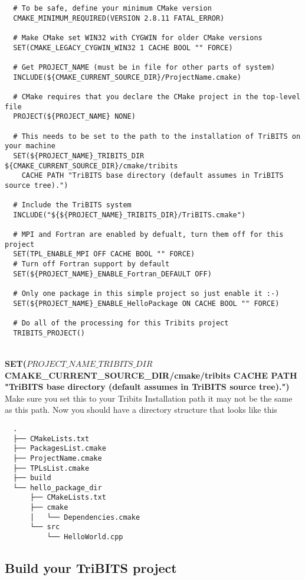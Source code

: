 \documentclass[12pt]{article}
\begin{document}
\begin{verbatim}
  # To be safe, define your minimum CMake version
  CMAKE_MINIMUM_REQUIRED(VERSION 2.8.11 FATAL_ERROR)
  
  # Make CMake set WIN32 with CYGWIN for older CMake versions
  SET(CMAKE_LEGACY_CYGWIN_WIN32 1 CACHE BOOL "" FORCE)
  
  # Get PROJECT_NAME (must be in file for other parts of system)
  INCLUDE(${CMAKE_CURRENT_SOURCE_DIR}/ProjectName.cmake)
  
  # CMake requires that you declare the CMake project in the top-level file
  PROJECT(${PROJECT_NAME} NONE)

  # This needs to be set to the path to the installation of TriBITS on your machine  
  SET(${PROJECT_NAME}_TRIBITS_DIR ${CMAKE_CURRENT_SOURCE_DIR}/cmake/tribits
    CACHE PATH "TriBITS base directory (default assumes in TriBITS source tree).")

  # Include the TriBITS system
  INCLUDE("${${PROJECT_NAME}_TRIBITS_DIR}/TriBITS.cmake")
  
  # MPI and Fortran are enabled by defualt, turn them off for this project
  SET(TPL_ENABLE_MPI OFF CACHE BOOL "" FORCE)
  # Turn off Fortran support by default
  SET(${PROJECT_NAME}_ENABLE_Fortran_DEFAULT OFF)
  
  # Only one package in this simple project so just enable it :-)
  SET(${PROJECT_NAME}_ENABLE_HelloPackage ON CACHE BOOL "" FORCE)
  
  # Do all of the processing for this Tribits project
  TRIBITS_PROJECT()
\end{verbatim}


\textbf{\\SET(${PROJECT\_NAME}\_TRIBITS\_DIR ${CMAKE\_CURRENT\_SOURCE\_DIR}/cmake/tribits 
    CACHE PATH "TriBITS base directory (default assumes in TriBITS source tree).")}
Make sure you set this to your Tribits Installation path it may not be the same as
this path.  Now you should have a directory structure that looks like this

\begin{verbatim}
  .
  ├── CMakeLists.txt
  ├── PackagesList.cmake
  ├── ProjectName.cmake
  ├── TPLsList.cmake
  ├── build
  └── hello_package_dir
      ├── CMakeLists.txt
      ├── cmake
      │   └── Dependencies.cmake
      └── src
          └── HelloWorld.cpp
\end{verbatim}

\subsection*{Build your TriBITS project}
\end{document}
